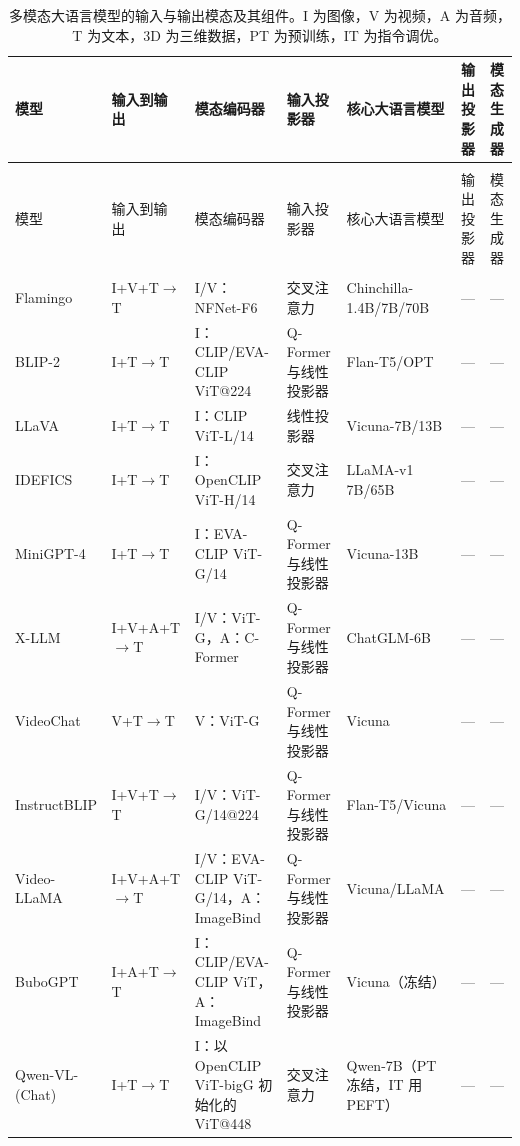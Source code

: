 \begin{landscape}
\small\setlength{\tabcolsep}{3pt}\renewcommand{\arraystretch}{1.09}
\begin{longtable}{@{}>{\raggedright\arraybackslash}p{21mm}
 >{\raggedright\arraybackslash}p{35mm}
 >{\raggedright\arraybackslash}p{38mm}
 >{\raggedright\arraybackslash}p{26mm}
 >{\raggedright\arraybackslash}p{27mm}
 >{\raggedright\arraybackslash}p{14mm}
 >{\raggedright\arraybackslash}p{29mm}@{}}
\caption{多模态大语言模型的输入与输出模态及其组件。I 为图像，V 为视频，A 为音频，T 为文本，3D 为三维数据，PT 为预训练，IT 为指令调优。}\label{tab:ch09-models}\\
\toprule
模型 & 输入到输出 & 模态编码器 & 输入投影器 & 核心大语言模型 & 输出投影器 & 模态生成器\\
\midrule
\endfirsthead
\multicolumn{7}{@{}l}{表 \thetable\ （续）}\\
\toprule
模型 & 输入到输出 & 模态编码器 & 输入投影器 & 核心大语言模型 & 输出投影器 & 模态生成器\\
\midrule
\endhead
\midrule
\multicolumn{7}{r@{}}{下页续}\\
\endfoot
\bottomrule
\endlastfoot
Flamingo & I+V+T$\to$T & I/V：NFNet-F6 & 交叉注意力 & Chinchilla-\allowbreak 1.4B/7B/70B & — & —\\
BLIP-2 & I+T$\to$T & I：CLIP/EVA-CLIP ViT@224 & Q-Former 与线性投影器 & Flan-T5/OPT & — & —\\
LLaVA & I+T$\to$T & I：CLIP ViT-L/14 & 线性投影器 & Vicuna-7B/13B & — & —\\
IDEFICS & I+T$\to$T & I：OpenCLIP ViT-H/14 & 交叉注意力 & LLaMA-v1 7B/65B & — & —\\
MiniGPT-4 & I+T$\to$T & I：EVA-CLIP ViT-G/14 & Q-Former 与线性投影器 & Vicuna-13B & — & —\\
X-LLM & I+V+A+T$\to$T & I/V：ViT-G，A：C-Former & Q-Former 与线性投影器 & ChatGLM-6B & — & —\\
VideoChat & V+T$\to$T & V：ViT-G & Q-Former 与线性投影器 & Vicuna & — & —\\
InstructBLIP & I+V+T$\to$T & I/V：ViT-G/14@224 & Q-Former 与线性投影器 & Flan-T5/Vicuna & — & —\\
Video-LLaMA & I+V+A+T$\to$T & I/V：EVA-CLIP ViT-G/14，A：ImageBind & Q-Former 与线性投影器 & Vicuna/LLaMA & — & —\\
BuboGPT & I+A+T$\to$T & I：CLIP/EVA-CLIP ViT，A：ImageBind & Q-Former 与线性投影器 & Vicuna（冻结） & — & —\\
Qwen-VL-\allowbreak (Chat) & I+T$\to$T & I：以 OpenCLIP ViT-bigG 初始化的 ViT@448 & 交叉注意力 & Qwen-7B（PT 冻结，IT 用 PEFT） & — & —\\

\end{longtable}
\end{landscape}
